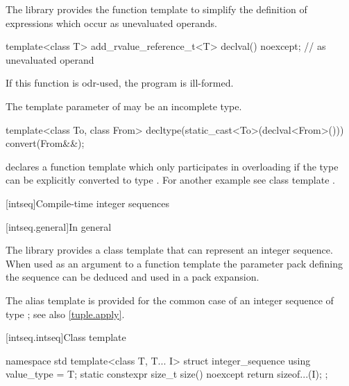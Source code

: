 \pnum
The library provides the function template  to simplify the definition of
expressions which occur as unevaluated operands.

%
\begin{itemdecl}
template<class T> add_rvalue_reference_t<T> declval() noexcept;    // as unevaluated operand
\end{itemdecl}

\begin{itemdescr}
\pnum
\remarks If this function is odr-used, the program is ill-formed.

\pnum
\remarks The template parameter  of  may be an incomplete type.
\end{itemdescr}

\pnum
\begin{example}
\begin{codeblock}
template<class To, class From> decltype(static_cast<To>(declval<From>())) convert(From&&);
\end{codeblock}
declares a function template  which only participates in overloading if the
type  can be explicitly converted to type . For another example see class
template .
\end{example}

[intseq]{Compile-time integer sequences}

[intseq.general]{In general}

\pnum
The library provides a class template that can represent an integer sequence.
When used as an argument to a function template the parameter pack defining the
sequence can be deduced and used in a pack expansion.
\begin{note}
The  alias template is provided for the common case of
an integer sequence of type ; see also \ref{tuple.apply}.
\end{note}

[intseq.intseq]{Class template }

%
%
\begin{codeblock}
namespace std {
  template<class T, T... I>
    struct integer_sequence {
      using value_type = T;
      static constexpr size_t size() noexcept { return sizeof...(I); }
    };
}
\end{codeblock}

